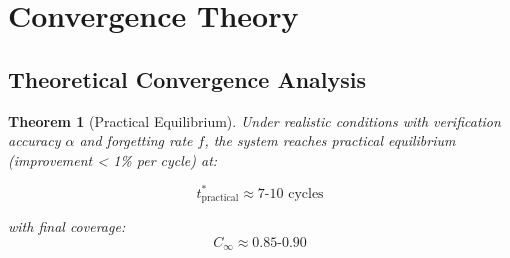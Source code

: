 \documentclass[12pt,a4paper]{article}
\newtheorem{theorem}{Theorem}[section]
\theoremstyle{definition}
\begin{document}
\newpage

\section{Convergence Theory}

\subsection{Theoretical Convergence Analysis}

\begin{theorem}[Practical Equilibrium]
\label{thm:equilibrium}
Under realistic conditions with verification accuracy $\alpha$ and forgetting rate $f$, the system reaches practical equilibrium (improvement < 1\% per cycle) at:

\begin{equation}
t_{\text{practical}}^* \approx 7\text{-}10 \text{ cycles}
\end{equation}

with final coverage:
\begin{equation}
C_{\infty} \approx 0.85\text{-}0.90
\end{equation}
\end{theorem}
\end{document}
